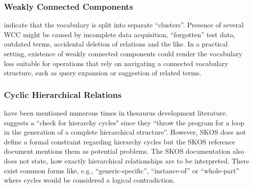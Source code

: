 

\subsubsection{Weakly Connected Components} indicate that the vocabulary is split into separate ``clusters''. Presence of several WCC might be caused by incomplete data acquisition, ``forgotten'' test data, outdated terms, accidental deletion of relations and the like. In a practical setting, existence of weakly connected components could render the vocabulary less suitable for operations that rely on navigating a connected vocabulary structure, such as query expansion or suggestion of related terms. 

 

\subsubsection{Cyclic Hierarchical Relations} have been mentioned numerous times in thesaurus development literature. \cite{Soergel2002} suggests a ``check for hierarchy cycles" since they ``throw the program for a loop in the generation of a complete hierarchical structure''. However, SKOS does not define a formal constraint regarding hierarchy cycles but the SKOS reference document mentions them as potential problems. The SKOS documentation also does not state, how exactly hierarchical relationships are to be interpreted. There exist common forms like, e.g., ``generic-specific'', ``instance-of'' or ``whole-part'' \cite{Hedden2010,Harpring2010,Aitchison2000} where cycles would be considered a logical contradiction.
 
